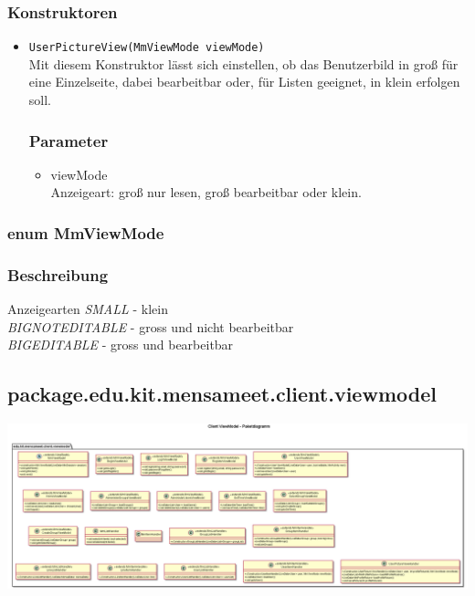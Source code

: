 \documentclass[a4paper]{scrreprt}
\begin{document}
\subsubsection*{Konstruktoren}
\begin{addmargin}[25pt]{0pt}
\begin{itemize}

\item \texttt{UserPictureView(MmViewMode viewMode)}\\
	Mit diesem Konstruktor lässt sich einstellen, ob das Benutzerbild in groß für eine Einzelseite, dabei bearbeitbar oder, für Listen geeignet, in klein erfolgen soll.

	\subsubsection*{Parameter}
	\begin{itemize}
	\item viewMode \\
		Anzeigeart: groß nur lesen, groß bearbeitbar oder klein.
	\end{itemize}

\end{itemize}
\end{addmargin}


\subsubsection{enum MmViewMode}
\subsubsection*{Beschreibung}
Anzeigearten
\textit{SMALL} - klein \\
\textit{BIGNOTEDITABLE} - gross und nicht bearbeitbar \\
\textit{BIGEDITABLE} - gross und bearbeitbar \\


\newpage
\subsection{package.edu.kit.mensameet.client.viewmodel}


\begin{center}
	\includegraphics[width=1.1\textwidth]{GUI/frontend-package-viewmodel.png}
\end{center} 
\end{document}
